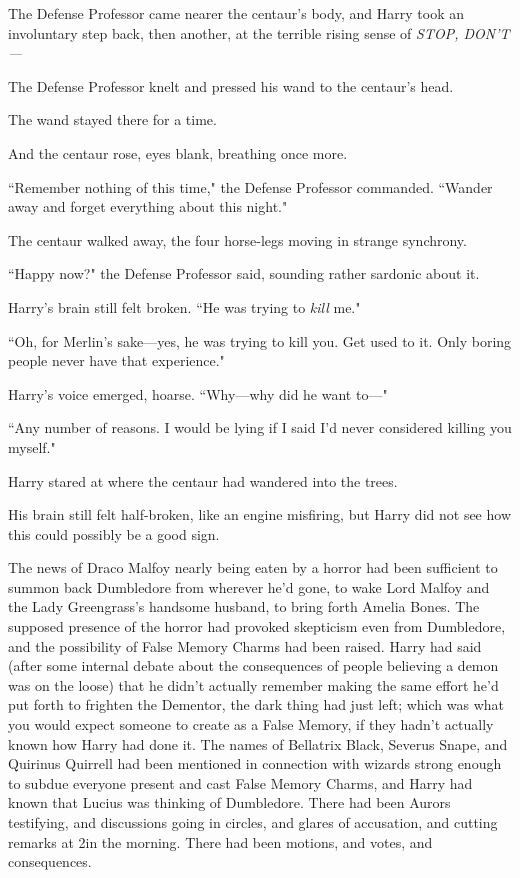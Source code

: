 The Defense Professor came nearer the centaur's body, and Harry took an involuntary step back, then another, at the terrible rising sense of \emph{STOP, DON'T—}

The Defense Professor knelt and pressed his wand to the centaur's head.

The wand stayed there for a time.

And the centaur rose, eyes blank, breathing once more.

``Remember nothing of this time," the Defense Professor commanded. ``Wander away and forget everything about this night."

The centaur walked away, the four horse-legs moving in strange synchrony.

``Happy now?" the Defense Professor said, sounding rather sardonic about it.

Harry's brain still felt broken. ``He was trying to \emph{kill} me."

``Oh, for Merlin's sake—yes, he was trying to kill you. Get used to it. Only boring people never have that experience."

Harry's voice emerged, hoarse. ``Why—why did he want to—"

``Any number of reasons. I would be lying if I said I'd never considered killing you myself."

Harry stared at where the centaur had wandered into the trees.

His brain still felt half-broken, like an engine misfiring, but Harry did not see how this could possibly be a good sign.

\later

The news of Draco Malfoy nearly being eaten by a horror had been sufficient to summon back Dumbledore from wherever he'd gone, to wake Lord Malfoy and the Lady Greengrass's handsome husband, to bring forth Amelia Bones. The supposed presence of the horror had provoked skepticism even from Dumbledore, and the possibility of False Memory Charms had been raised. Harry had said (after some internal debate about the consequences of people believing a demon was on the loose) that he didn't actually remember making the same effort he'd put forth to frighten the Dementor, the dark thing had just left; which was what you would expect someone to create as a False Memory, if they hadn't actually known how Harry had done it. The names of Bellatrix Black, Severus Snape, and Quirinus Quirrell had been mentioned in connection with wizards strong enough to subdue everyone present and cast False Memory Charms, and Harry had known that Lucius was thinking of Dumbledore. There had been Aurors testifying, and discussions going in circles, and glares of accusation, and cutting remarks at 2\am in the morning. There had been motions, and votes, and consequences.

